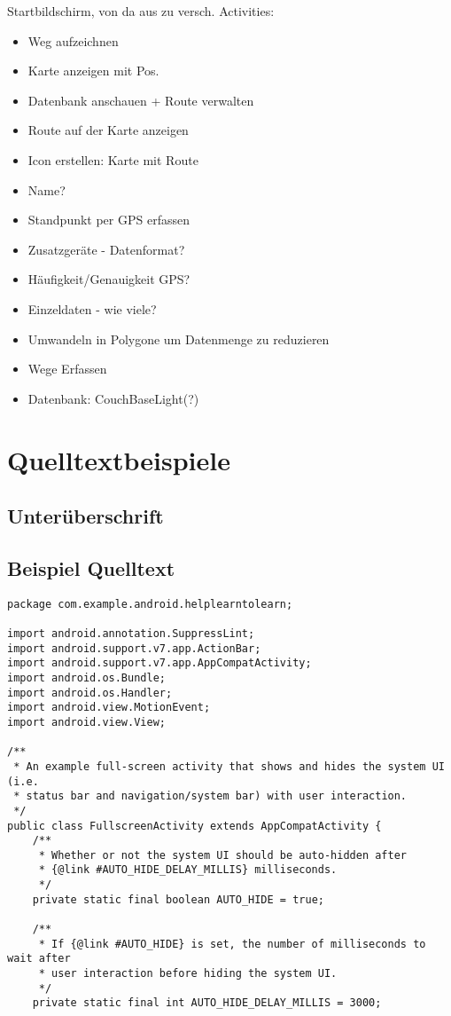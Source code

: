 \documentclass[a4paper, 10pt]{scrartcl}
\begin{document}
Startbildschirm, von da aus zu versch. Activities:
\begin{itemize}
\item Weg aufzeichnen
\item Karte anzeigen mit Pos.
\item Datenbank anschauen + Route verwalten
\item Route auf der Karte anzeigen
\end{itemize}

\begin{itemize}
 \item Icon erstellen: Karte mit Route
\item Name?
\item Standpunkt per GPS erfassen
\item Zusatzgeräte - Datenformat?
\item Häufigkeit/Genauigkeit GPS?
\item Einzeldaten - wie viele?
\item Umwandeln in Polygone um Datenmenge zu reduzieren
\item Wege Erfassen
\item Datenbank: CouchBaseLight(?)
\end{itemize}





\section{Quelltextbeispiele}

\subsection{Unterüberschrift}

\subsection{Beispiel Quelltext}

\begin{lstlisting}
package com.example.android.helplearntolearn;

import android.annotation.SuppressLint;
import android.support.v7.app.ActionBar;
import android.support.v7.app.AppCompatActivity;
import android.os.Bundle;
import android.os.Handler;
import android.view.MotionEvent;
import android.view.View;

/**
 * An example full-screen activity that shows and hides the system UI (i.e.
 * status bar and navigation/system bar) with user interaction.
 */
public class FullscreenActivity extends AppCompatActivity {
    /**
     * Whether or not the system UI should be auto-hidden after
     * {@link #AUTO_HIDE_DELAY_MILLIS} milliseconds.
     */
    private static final boolean AUTO_HIDE = true;

    /**
     * If {@link #AUTO_HIDE} is set, the number of milliseconds to wait after
     * user interaction before hiding the system UI.
     */
    private static final int AUTO_HIDE_DELAY_MILLIS = 3000;
\end{lstlisting}
\end{document}

